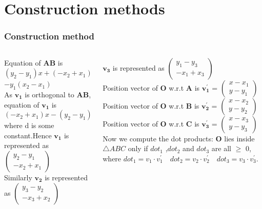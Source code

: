 \documentclass{beamer}
\renewcommand{\vec}[1]{\mathbf{#1}}
\begin{document}
\section*{Construction methods}
\begin{frame}[fragile]
\footnotesize
\frametitle{Construction method}
\begin{columns}
\begin{column}{0.5\textwidth}

Equation of $\vec{AB}$ is
$(y_2-y_1)x + (-x_2+x_1)y = x_1(y_2-y_1)$
 $ - y_1(x_2-x_1)$\\
As $\vec{v_1}$ is orthogonal to $\vec{AB}$, equation of $\vec{v_1}$ is
\begin{equation}
(-x_2+x_1)x - (y_2-y_1)y = d
\end{equation}
where d is some constant.Hence $\vec{v_1}$ is represented as $\begin{pmatrix}y_2-y_1\\-x_2+x_1\end{pmatrix}$\\
Similarly $\vec{v_2}$ is represented as $\begin{pmatrix}y_3-y_2\\-x_3+x_2\end{pmatrix}$\\
\end{column}
\begin{column}{0.5\textwidth}   

$\vec{v_3}$ is represented as $\begin{pmatrix}y_1-y_3\\-x_1+x_3\end{pmatrix}$\\
Position vector of $\vec{O}$ w.r.t $\vec{A}$ is $\vec{v_{1}^{'}}$ = $\begin{pmatrix}x-x_1\\y-y_1\end{pmatrix}$\\
Position vector of $\vec{O}$ w.r.t $\vec{B}$ is $\vec{v_{2}^{'}}$ = $\begin{pmatrix}x-x_2\\y-y_2\end{pmatrix}$\\
Position vector of $\vec{O}$ w.r.t $\vec{C}$ is $\vec{v_{3}^{'}}$ = $\begin{pmatrix}x-x_3\\y-y_3\end{pmatrix}$\\
Now we compute the dot products: $\vec{O}$ lies inside $\triangle ABC$ only if $dot_1$ ,$dot_2$ and $dot_3$ are all $\geqslant$ 0, where $dot_1 = v_1 \cdot v_{1}^{'} \quad dot_2 = v_2 \cdot v_{2}^{'} \quad dot_3 = v_3 \cdot v_{3}^{'}$.



\end{column}
\end{columns}
\end{frame}
\end{document}
